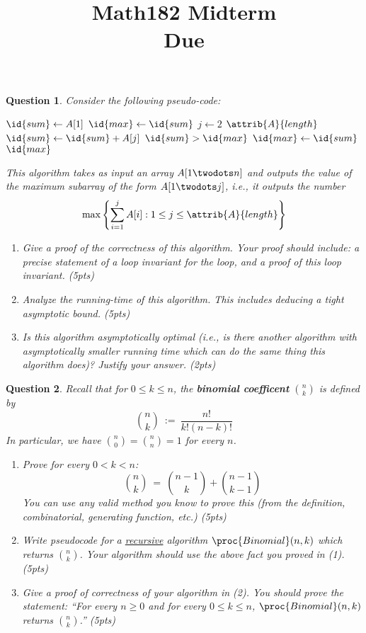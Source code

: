 \documentclass[11pt]{amsart}
\title{Math182 Midterm %
\\ Due \duedate}
\theoremstyle{theorem}
\newtheorem{question}{Question}
\begin{document}
\maketitle


\begin{question}
Consider the following pseudo-code:
\begin{codebox}
\li $\id{sum}\gets A[1]$
\li $\id{max}\gets \id{sum}$
\li \For $j\gets 2$ \To $\attrib{A}{length}$
\li	\Do
		$\id{sum}\gets\id{sum}+A[j]$
\li		\If $\id{sum}>\id{max}$
\li			\Then
				$\id{max}\gets\id{sum}$
			\End
	\End
\li \Return $\id{max}$
\end{codebox}
This algorithm takes as input an array $A[1\twodots n]$ and outputs the value of the maximum subarray of the form $A[1\twodots j]$, i.e., it outputs the number
\[
\max\left\{\sum_{i=1}^{j}A[i]:1\leq j\leq \attrib{A}{length}\right\}
\]
\begin{enumerate}
\item Give a proof of the correctness of this algorithm. Your proof should include: a precise statement of a loop invariant for the \For loop, and a proof of this loop invariant. (5pts)
\item Analyze the running-time of this algorithm. This includes deducing a tight asymptotic bound. (5pts)
\item Is this algorithm asymptotically optimal (i.e., is there another algorithm with asymptotically smaller running time which can do the same thing this algorithm does)? Justify your answer. (2pts)
\end{enumerate}
\end{question}


\begin{question}
Recall that for $0\leq k\leq n$, the \textbf{binomial coefficent} ${n\choose k}$ is defined by
\[
{n\choose k} \ := \ \frac{n!}{k!(n-k)!}
\]
In particular, we have ${n\choose 0}={n\choose n}=1$ for every $n$.
\begin{enumerate}
\item Prove for every $0<k<n$:
\[
{n\choose k} \ = \ {n-1\choose k}+{n-1\choose k-1}
\]
You can use any valid method you know to prove this (from the definition, combinatorial, generating function, etc.) (5pts)
\item Write pseudocode for a \underline{recursive} algorithm $\proc{Binomial}(n,k)$ which returns ${n\choose k}$. Your algorithm should use the above fact you proved in (1). (5pts)
\item Give a proof of correctness of your algorithm in (2). You should prove the statement: ``For every $n\geq 0$ and for every $0\leq k\leq n$, $\proc{Binomial}(n,k)$ returns ${n\choose k}$.'' (5pts)
\end{enumerate}
\end{question}
\end{document}
